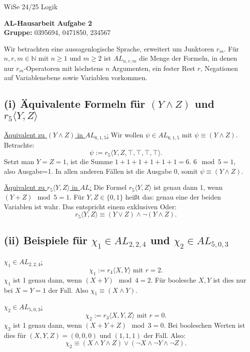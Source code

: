 \documentclass[12pt,a4paper]{article}
\begin{document}
\noindent
\noindent \large WiSe 24/25 \hfill
Logik

\begin{center}
\textbf{AL-Hausarbeit  Aufgabe 2}\\
\vspace*{0.5cm}
\textbf{Gruppe:} 0395694, 0471850, 234567 %

\end{center}

Wir betrachten eine aussagenlogische Sprache, erweitert um Junktoren $r_m$. Für $n,r,m \in \mathbb{N}$ mit $n \ge 1$ und $m \ge 2$ ist $AL_{n,r,m}$ die Menge der Formeln, in denen nur $r_m$-Operatoren mit höchstens $n$ Argumenten, ein fester Rest $r$, Negationen auf Variablenebene sowie Variablen vorkommen.

\subsection*{(i) Äquivalente Formeln für $(Y \land Z)$ und $r_5 \langle Y, Z \rangle$}

\underline{Äquivalent zu $(Y \land Z)$ in $AL_{6,1,5}$:}  
Wir wollen $\psi \in AL_{6,1,5}$ mit $\psi \equiv (Y \land Z)$.  
Betrachte:
\[
\psi := r_5\langle Y, Z, \top, \top, \top, \top \rangle.
\]
Setzt man $Y=Z=1$, ist die Summe $1+1+1+1+1+1=6$. $6 \mod 5=1$, also Ausgabe=1. In allen anderen Fällen ist die Ausgabe 0, somit $\psi \equiv (Y \land Z)$.

\underline{Äquivalent zu $r_5\langle Y,Z \rangle$ in $AL$:}  
Die Formel $r_5\langle Y,Z \rangle$ ist genau dann 1, wenn $(Y+Z)\mod 5=1$. Für $Y,Z \in \{0,1\}$ heißt das: genau eine der beiden Variablen ist wahr. Das entspricht einem exklusiven Oder:
\[
r_5\langle Y,Z\rangle \equiv (Y \lor Z) \land \neg(Y \land Z).
\]

\subsection*{(ii) Beispiele für $\chi_1 \in AL_{2,2,4}$ und $\chi_2 \in AL_{5,0,3}$}

\underline{$\chi_1 \in AL_{2,2,4}$:}  
\[
\chi_1 := r_4\langle X,Y \rangle \text{ mit } r=2.
\]
$\chi_1$ ist 1 genau dann, wenn $(X+Y) \mod4=2$. Für boolesche $X,Y$ ist dies nur bei $X=Y=1$ der Fall.  
Also $\chi_1 \equiv (X \land Y)$.

\underline{$\chi_2 \in AL_{5,0,3}$:}  
\[
\chi_2 := r_3\langle X,Y,Z \rangle \text{ mit } r=0.
\]
$\chi_2$ ist 1 genau dann, wenn $(X+Y+Z)\mod 3=0$. Bei booleschen Werten ist dies für $(X,Y,Z)=(0,0,0)$ und $(1,1,1)$ der Fall. Also:
\[
\chi_2 \equiv (X \land Y \land Z) \lor (\neg X \land \neg Y \land \neg Z).
\]
\end{document}
